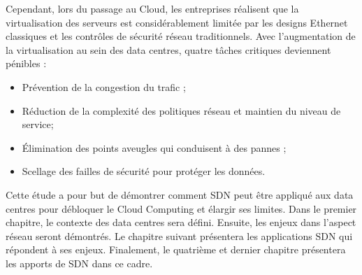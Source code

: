 \par
Cependant, lors du passage au Cloud, les entreprises réalisent que la virtualisation des serveurs est considérablement limitée par les designs Ethernet classiques et les contrôles de sécurité réseau traditionnels. Avec l'augmentation de la virtualisation au sein des data centres, quatre tâches critiques deviennent pénibles :
\begin{itemize}
\item Prévention de la congestion du trafic ;
\item Réduction de la complexité des politiques réseau et maintien du niveau de service;
\item Élimination des points aveugles qui conduisent à des pannes ;
\item  Scellage des failles de sécurité pour protéger les données.
\end{itemize}

\par
Cette étude a pour but de démontrer comment SDN peut être appliqué aux data centres pour débloquer le Cloud Computing et élargir ses limites. Dans le premier chapitre, le contexte des data centres sera défini. Ensuite, les enjeux dans l'aspect réseau seront démontrés. Le chapitre suivant présentera les applications SDN qui répondent à ses enjeux. Finalement, le quatrième et dernier chapitre présentera les apports de SDN dans ce cadre.

